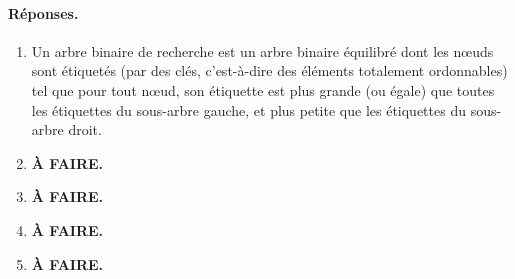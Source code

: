 \paragraph{Réponses.}

\begin{enumerate}

  \item Un arbre binaire de recherche est un arbre binaire équilibré
    dont les n{\oe}uds sont étiquetés (par des clés, c'est-à-dire des
    éléments totalement ordonnables) tel que pour tout n{\oe}ud, son
    étiquette est plus grande (ou égale) que toutes les étiquettes du
    sous-arbre gauche, et plus petite que les étiquettes du sous-arbre
    droit.

  \item \textbf{À FAIRE.}

  \item \textbf{À FAIRE.}

  \item \textbf{À FAIRE.}

  \item \textbf{À FAIRE.}

\end{enumerate}

